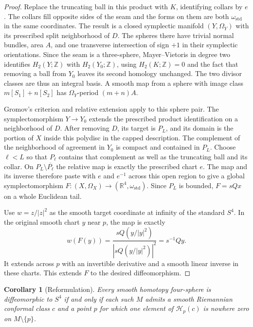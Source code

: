 \documentclass[11pt,letterpaper]{article}
\numberwithin{equation}{section}
\newtheorem{corollary}[proposition]{Corollary}
\begin{document}
\begin{proof}
Replace the truncating ball in this product with \(K\), identifying
collars by \(e\). The collars fill opposite sides of the seam and
the forms on them are both \(\omega_{\mathrm{std}}\) in the same
coordinates. The result is a closed symplectic manifold
\((Y,\Omega_Y)\) with its prescribed split neighborhood of \(D\).
The spheres there have trivial normal bundles, area \(A\), and
one transverse intersection of sign \(+1\) in their symplectic
orientations. Since the seam is a three-sphere, Mayer--Vietoris
in degree two identifies \(H_2(Y;\mathbb Z)\) with
\(H_2(Y_0;\mathbb Z)\), using \(H_2(K;\mathbb Z)=0\) and the
fact that removing a ball from \(Y_0\) leaves its second homology
unchanged. The two divisor classes are thus an integral basis.
A smooth map from a sphere with image class \(m[S_1]+n[S_2]\) has
\(\Omega_Y\)-period \((m+n)A\).

Gromov's criterion and relative extension
\cite[\S2.4, product criterion and following remark, p.~337]{Gromov1985PseudoHolomorphic}
apply to this sphere pair. The symplectomorphism
\(Y\to Y_0\) extends the prescribed product identification on a
neighborhood of \(D\). After removing \(D\), its target is
\(P_L\), and its domain is the portion of \(X\) inside this
polydisc in the capped description. The complement of the
neighborhood of agreement in \(Y_0\) is compact and contained
in \(P_L\). Choose \(\ell<L\) so that \(P_\ell\) contains
that complement as well as the truncating ball and its collar.
On \(P_L\setminus\overline{P_\ell}\) the relative map is
exactly the prescribed chart \(e\). The map and its inverse
therefore paste with \(e\) and \(e^{-1}\) across this open region
to give a global symplectomorphism
\(F\colon(X,\Omega_X)\to(\mathbb R^4,\omega_{\mathrm{std}})\).
Since \(P_L\) is bounded, \(F=sQx\) on a whole Euclidean tail.

Use \(w=z/|z|^2\) as the smooth target coordinate at infinity
of the standard \(S^4\). In the original smooth chart \(y\) near
\(p\), the map is exactly
\[
 w(F(y))=\frac{sQ(y/|y|^2)}{|sQ(y/|y|^2)|^2}
       =s^{-1}Qy .
\]
It extends across \(p\) with an invertible derivative and a
smooth linear inverse in these charts. This extends \(F\)
to the desired diffeomorphism.
\end{proof}

\begin{corollary}[Reformulation]\label{cor:equivalence}
Every smooth homotopy four-sphere is diffeomorphic to \(S^4\) if
and only if each such \(M\) admits a smooth Riemannian conformal
class \(c\) and a point \(p\) for which one element of
\(\mathcal H_p(c)\) is nowhere zero on \(M\setminus\{p\}\).
\end{corollary}
\end{document}

